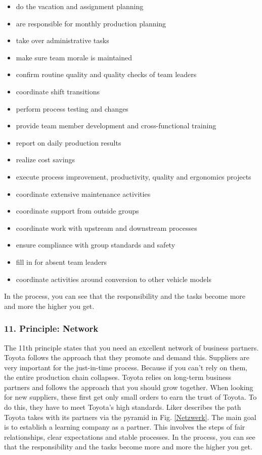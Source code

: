 \documentclass[a4paper,12pt]{scrartcl}
\begin{document}
\begin{itemize}
\begin{itemize}
        \item do the vacation and assignment planning
        \item are responsible for monthly production planning
        \item take over administrative tasks
        \item make sure team morale is maintained
        \item confirm routine quality and quality checks of team leaders
        \item coordinate shift transitions
        \item perform process testing and changes
        \item provide team member development and cross-functional training
        \item report on daily production results
        \item realize cost savings
        \item execute process improvement, productivity, quality and ergonomics projects
        \item coordinate extensive maintenance activities
        \item coordinate support from outside groups
        \item coordinate work with upstream and downstream processes
        \item ensure compliance with group standards and safety
        \item fill in for absent team leaders
        \item coordinate activities around conversion to other vehicle models
    \end{itemize}
\end{itemize}

In the process, you can see that the responsibility and the tasks become more and more the higher you get. 

\subsubsection{11. Principle: Network}


The 11th principle states that you need an excellent network of business partners. Toyota follows the approach that they promote and demand this. Suppliers are very important for the just-in-time process. Because if you can't rely on them, the entire production chain collapses. Toyota relies on long-term business partners and follows the approach that you should grow together. When looking for new suppliers, these first get only small orders to earn the trust of Toyota. To do this, they have to meet Toyota's high standards. Liker describes the path Toyota takes with its partners via the pyramid in Fig. \ref{Netzwerk}. The main goal is to establish a learning company as a partner. This involves the steps of fair relationships, clear expectations and stable processes.
In the process, you can see that the responsibility and the tasks become more and more the higher you get. 
\end{document}
